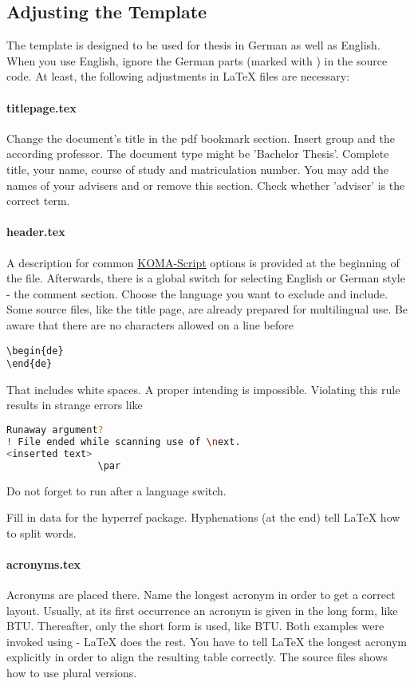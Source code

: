 \subsection{Adjusting the Template}
%
The template is designed to be used for thesis in German as well as English.
When you use English, ignore the German parts (marked with ) 
in the source code.
At least, the following adjustments in {\LaTeX} files are necessary:
%
\paragraph{titlepage.tex}
%
Change the document's title in the pdf bookmark section.
Insert group and the according professor. 
The document type might be 'Bachelor Thesis'.
Complete title, your name, course of study and matriculation number.
You may add the names of your advisers and or remove this section.
Check whether 'adviser' is the correct term.
%
\paragraph{header.tex}
%
A description for common \href{http://www.komascript.de/}{KOMA-Script} options 
is provided at the beginning of the file.
Afterwards, there is a global switch for selecting English or German style - the
comment section.
Choose the language you want to exclude and include.
Some source files, like the title page, are already prepared for
multilingual use.
Be aware that there are no characters allowed on a line before
\begin{lstlisting}[language={[LaTeX]TeX}]
\begin{de}
\end{de}
\end{lstlisting}
That includes white spaces. A proper intending is impossible.
Violating this rule results in strange errors like
\begin{lstlisting}[language=bash]
Runaway argument?
! File ended while scanning use of \next.
<inserted text> 
                \par
\end{lstlisting}
Do not forget to run  after a language switch.

Fill in data for the hyperref package.
Hyphenations (at the end) tell {\LaTeX} how to split words.
%
%
\paragraph{acronyms.tex}
%
Acronyms are placed there. Name the longest acronym in order to get a correct 
layout.
Usually, at its first occurrence an acronym is given in the long form, 
like \ac{BTU}.
Thereafter, only the short form is used, like \ac{BTU}.
Both examples were invoked using  - {\LaTeX} does 
the rest.
You have to tell \LaTeX{} the longest acronym explicitly in order to align
the resulting table correctly.
The source files shows how to use plural versions.
%
